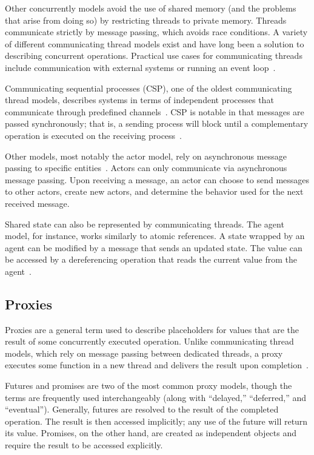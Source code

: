 \documentclass{sig-alternate}
\begin{document}
Other concurrently models avoid the use of shared memory (and the problems that arise from doing so) by restricting threads to private memory. Threads communicate strictly by message passing, which avoids race conditions. A variety of different communicating thread models exist and have long been a solution to describing concurrent operations. Practical use cases for communicating threads include communication with external systems or running an event loop~\cite{Swalens2014}.

Communicating sequential processes (CSP), one of the oldest communicating thread models, describes systems in terms of independent processes that communicate through predefined channels~\cite{Hoare1978}. CSP is notable in that messages are passed synchronously; that is, a sending process will block until a complementary operation is executed on the receiving process~\cite{Swalens2014}.

Other models, most notably the actor model, rely on asynchronous message passing to specific entities~\cite{Agha1986}. Actors can only communicate via asynchronous message passing. Upon receiving a message, an actor can choose to send messages to other actors, create new actors, and determine the behavior used for the next received message.

Shared state can also be represented by communicating threads. The agent model, for instance, works similarly to atomic references. A state wrapped by an agent can be modified by a message that sends an updated state. The value can be accessed by a dereferencing operation that reads the current value from the agent~\cite{Swalens2014}.

\subsection{Proxies}

Proxies are a general term used to describe placeholders for values that are the result of some concurrently executed operation. Unlike communicating thread models, which rely on message passing between dedicated threads, a proxy executes some function in a new thread and delivers the result upon completion~\cite{Swalens2014}.

Futures and promises are two of the most common proxy models, though the terms are frequently used interchangeably (along with ``delayed,'' ``deferred,'' and ``eventual''). Generally, futures are resolved to the result of the completed operation. The result is then accessed implicitly; any use of the future will return its value. Promises, on the other hand, are created as independent objects and require the result to be accessed explicitly.
\end{document}
